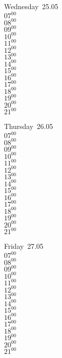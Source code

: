 \documentclass[11pt,a4paper]{book}\usepackage[]{graphicx}\usepackage[]{color}
\begin{document}
\begin{weekdaybox}
  Wednesday~25.05\\
  { 
  \vfill
  $07^{00}$\\
$08^{00}$\\
$09^{00}$\\
$10^{00}$\\
$11^{00}$\\
$12^{00}$\\
$13^{00}$\\
$14^{00}$\\
$15^{00}$\\
$16^{00}$\\
$17^{00}$\\
$18^{00}$\\
$19^{00}$\\
$20^{00}$\\
$21^{00}$\\
  }
\end{weekdaybox}
\clearpage
\begin{headerbox}
\end{headerbox}
\begin{weekdaybox}
  Thursday~26.05\\
  { 
  \vfill
  $07^{00}$\\
$08^{00}$\\
$09^{00}$\\
$10^{00}$\\
$11^{00}$\\
$12^{00}$\\
$13^{00}$\\
$14^{00}$\\
$15^{00}$\\
$16^{00}$\\
$17^{00}$\\
$18^{00}$\\
$19^{00}$\\
$20^{00}$\\
$21^{00}$\\
  }
\end{weekdaybox} 
\begin{weekdaybox}
  Friday~27.05\\
  { 
  \vfill
  $07^{00}$\\
$08^{00}$\\
$09^{00}$\\
$10^{00}$\\
$11^{00}$\\
$12^{00}$\\
$13^{00}$\\
$14^{00}$\\
$15^{00}$\\
$16^{00}$\\
$17^{00}$\\
$18^{00}$\\
$19^{00}$\\
$20^{00}$\\
$21^{00}$\\
  }
\end{weekdaybox}
\end{document}
